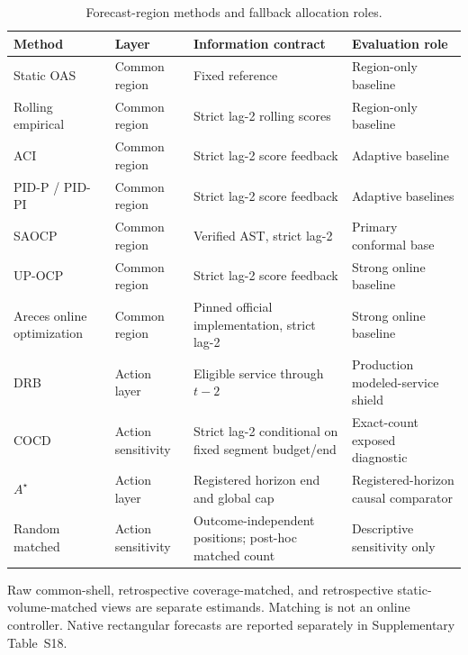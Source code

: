 
\begin{table}[!tbp]
\centering
\caption{Forecast-region methods and fallback allocation roles.}
\label{tab:methods}
\scriptsize
\renewcommand{\arraystretch}{0.88}
\setlength{\tabcolsep}{4pt}
\begin{tabularx}{\linewidth}{@{}l l >{\raggedright\arraybackslash}X >{\raggedright\arraybackslash}X@{}}
\toprule
Method & Layer & Information contract & Evaluation role \\
\midrule
Static OAS & Common region & Fixed reference & Region-only baseline \\
Rolling empirical & Common region & Strict lag-2 rolling scores & Region-only baseline \\
ACI & Common region & Strict lag-2 score feedback & Adaptive baseline \\
PID-P / PID-PI & Common region & Strict lag-2 score feedback & Adaptive baselines \\
SAOCP & Common region & Verified AST, strict lag-2 & Primary conformal base \\
UP-OCP & Common region & Strict lag-2 score feedback & Strong online baseline \\
Areces online optimization & Common region & Pinned official implementation, strict lag-2 & Strong online baseline \\
DRB & Action layer & Eligible service through $t-2$ & Production modeled-service shield \\
COCD & Action sensitivity & Strict lag-2 conditional on fixed segment budget/end & Exact-count exposed diagnostic \\
$A^\star$ & Action layer & Registered horizon end and global cap & Registered-horizon causal comparator \\
Random matched & Action sensitivity & Outcome-independent positions; post-hoc matched count & Descriptive sensitivity only \\
\bottomrule
\end{tabularx}
\par\footnotesize Raw common-shell, retrospective coverage-matched, and retrospective static-volume-matched views are separate estimands. Matching is not an online controller. Native rectangular forecasts are reported separately in Supplementary Table~S18.
\end{table}
